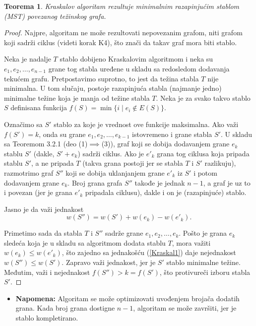 \documentclass[a4paper,12pt]{article}
\numberwithin{algorithm}{section}
\theoremstyle{plain}
\newtheorem{theorem}{Teorema}[section]
\theoremstyle{definition}
\theoremstyle{remark}
\begin{document}
\begin{theorem}
    Kraskalov algoritam rezultuje minimalnim razapinjućim stablom (MST) povezanog težinskog grafa.
\end{theorem}
\begin{proof}
    Najpre, algoritam ne može rezultovati nepovezanim grafom, niti grafom koji sadrži ciklus (videti korak K4), što znači da takav graf mora biti stablo.

    Neka je nadalje $T$ stablo dobijeno Kraskalovim algoritmom i neka su $e_1, e_2, \dots, e_{n-1}$ grane tog stabla uređene u skladu sa redosledom dodavanja tekućem grafu. Pretpostavimo suprotno, to jest da težina stabla $T$ nije minimalna. U tom slučaju, postoje razapinjuća stabla (najmanje jedno) minimalne težine koja je manja od težine stabla $T$. Neka je za svako takvo stablo $S$ definisana funkcija $f(S) = \min\{i \mid e_i \notin E(S)\}$.

    Označimo sa $S'$ stablo za koje je vrednost ove funkcije maksimalna. Ako važi $f(S') = k$, onda su grane $e_1, e_2, \dots, e_{k-1}$ istovremeno i grane stabla $S'$. U skladu sa Teoremom 3.2.1 (deo (1)$\implies$(3)), graf koji se dobija dodavanjem grane $e_k$ stablu $S'$ (dakle, $S' + e_k$) sadrži ciklus. Ako je $e'_k$ grana tog ciklusa koja pripada stablu $S'$, a ne pripada $T$ (takva grana postoji jer se stabla $T$ i $S'$ razlikuju), razmotrimo graf $S''$ koji se dobija uklanjanjem grane $e'_k$ iz $S'$ i potom dodavanjem grane $e_k$. Broj grana grafa $S''$ takođe je jednak $n - 1$, a graf je uz to i povezan (jer je grana $e'_k$ pripadala ciklusu), dakle i on je (razapinjuće) stablo.

    Jasno je da važi jednakost
    \begin{equation}
        w(S'') = w(S') + w(e_k) - w(e'_k).
        \label{Kraskal1}
    \end{equation}

    Primetimo sada da stabla $T$ i $S''$ sadrže grane $e_1, e_2, \dots, e_k$. Pošto je grana $e_k$ sledeća koja je u skladu sa algoritmom dodata stablu $T$, mora važiti $w(e_k) \le w(e'_k)$, što zajedno sa jednakošću (\ref{Kraskal1}) daje nejednakost $w(S'') \le w(S')$. Zapravo važi jednakost, jer je $S'$ stablo minimalne težine. Međutim, važi i nejednakost $f(S'') > k = f(S')$, što protivureči izboru stabla $S'$.
\end{proof}

\begin{itemize}
    \item \textbf{Napomena:} Algoritam se može optimizovati uvođenjem brojača dodatih grana. Kada broj grana dostigne $n-1$, algoritam se može završiti, jer je stablo kompletirano.
\end{itemize}
\end{document}
